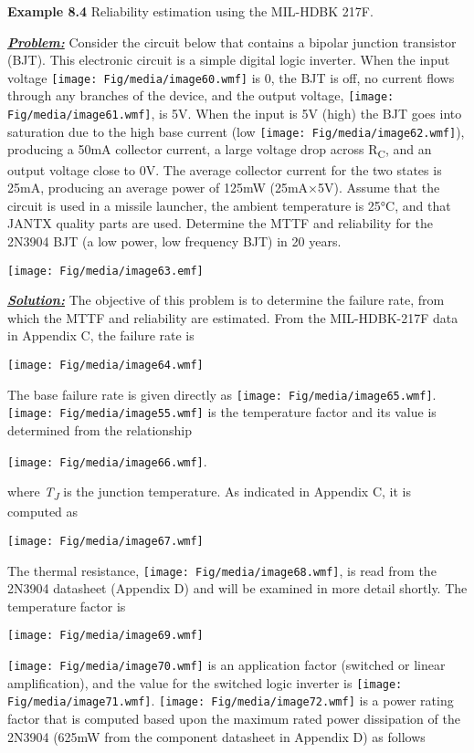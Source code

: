 \textbf{\hfill\break
Example 8.4} Reliability estimation using the MIL-HDBK 217F.

\emph{\textbf{\ul{Problem:}}} Consider the circuit below that contains a
bipolar junction transistor (BJT). This electronic circuit is a simple
digital logic inverter. When the input voltage
\texttt{[image: Fig/media/image60.wmf]} is 0, the BJT is off, no current
flows through any branches of the device, and the output voltage,
\texttt{[image: Fig/media/image61.wmf]}, is 5V. When the input is 5V
(high) the BJT goes into saturation due to the high base current (low
\texttt{[image: Fig/media/image62.wmf]}), producing a 50mA collector
current, a large voltage drop across R\textsubscript{C}, and an output
voltage close to 0V. The average collector current for the two states is
25mA, producing an average power of 125mW (25mA×5V). Assume that the
circuit is used in a missile launcher, the ambient temperature is 25°C,
and that JANTX quality parts are used. Determine the MTTF and
reliability for the 2N3904 BJT (a low power, low frequency BJT) in 20
years.

\texttt{[image: Fig/media/image63.emf]}

\emph{\textbf{\ul{Solution:}}} The objective of this problem is to
determine the failure rate, from which the MTTF and reliability are
estimated. From the MIL-HDBK-217F data in Appendix C, the failure rate
is

\texttt{[image: Fig/media/image64.wmf]}

The base failure rate is given directly as
\texttt{[image: Fig/media/image65.wmf]}.
\texttt{[image: Fig/media/image55.wmf]} is the temperature factor and
its value is determined from the relationship

\texttt{[image: Fig/media/image66.wmf]}.

where \emph{T\textsubscript{J}} is the junction temperature. As
indicated in Appendix C, it is computed as

\texttt{[image: Fig/media/image67.wmf]}

The thermal resistance, \texttt{[image: Fig/media/image68.wmf]}, is read
from the 2N3904 datasheet (Appendix D) and will be examined in more
detail shortly. The temperature factor is

\texttt{[image: Fig/media/image69.wmf]}

\texttt{[image: Fig/media/image70.wmf]} is an application factor
(switched or linear amplification), and the value for the switched logic
inverter is \texttt{[image: Fig/media/image71.wmf]}.
\texttt{[image: Fig/media/image72.wmf]} is a power rating factor that is
computed based upon the maximum rated power dissipation of the 2N3904
(625mW from the component datasheet in Appendix D) as follows

